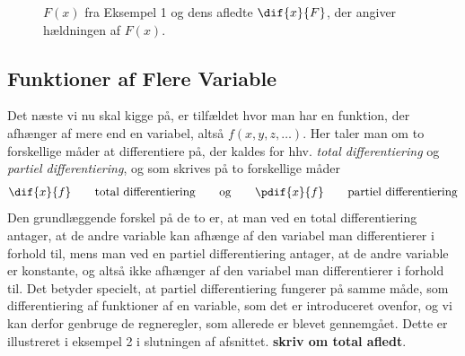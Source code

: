 \begin{figure}[h!]
	\centering
	\caption{$F(x)$ fra Eksempel 1 og dens afledte $\dif{x}{F}$, der
		angiver hældningen af $F(x)$.}
	\label{fig:eks1}
\end{figure}

\subsection{Funktioner af Flere Variable}
Det næste vi nu skal kigge på, er tilfældet hvor man har en funktion, der afhænger af mere end en variabel, altså $f(x,y,z,\ldots)$. Her taler man om to forskellige måder at differentiere på, der kaldes for hhv. \emph{total differentiering} og \emph{partiel differentiering}, og som skrives på to forskellige måder
\begin{align*}
\dif{x}{f} \qquad \text{total differentiering} \qquad \text{og} \qquad \pdif{x}{f} \qquad \text{partiel differentiering}
\end{align*} 
Den grundlæggende forskel på de to er, at man ved en total differentiering antager, at de andre variable kan afhænge af den variabel man differentierer i forhold til, mens man ved en partiel differentiering antager, at de andre variable er konstante, og altså ikke afhænger af den variabel man differentierer i forhold til. Det betyder specielt, at partiel differentiering fungerer på samme måde, som differentiering af funktioner af en variable, som det er introduceret ovenfor, og vi kan derfor genbruge de regneregler, som allerede er blevet gennemgået. Dette er illustreret i eksempel 2 i slutningen af afsnittet. \textbf{skriv om total afledt}.

